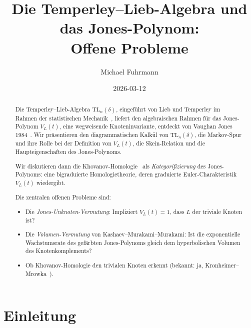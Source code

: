 \documentclass[12pt,a4paper]{amsart}
\theoremstyle{definition}
\theoremstyle{remark}
\begin{document}
\begin{abstract}
Die Temperley--Lieb-Algebra $\mathrm{TL}_n(\delta)$, eingeführt von Lieb und
Temperley im Rahmen der statistischen Mechanik~\cite{TemperleyLieb1971},
liefert den algebraischen Rahmen für das Jones-Polynom $V_L(t)$, eine
wegweisende Knoteninvariante, entdeckt von Vaughan Jones 1984~\cite{Jones1985}.
Wir präsentieren den diagrammatischen Kalkül von $\mathrm{TL}_n(\delta)$,
die Markov-Spur und ihre Rolle bei der Definition von $V_L(t)$, die Skein-Relation
und die Haupteigenschaften des Jones-Polynoms.

Wir diskutieren dann die Khovanov-Homologie~\cite{Khovanov2000} als
\emph{Kategorifizierung} des Jones-Polynoms: eine bigraduierte Homologietheorie,
deren graduierte Euler-Charakteristik $V_L(t)$ wiedergibt.

Die zentralen offenen Probleme sind:
\begin{itemize}
\item Die \emph{Jones-Unknoten-Vermutung}: Impliziert $V_L(t) = 1$, dass $L$
      der triviale Knoten ist?
\item Die \emph{Volumen-Vermutung} von Kashaev--Murakami--Murakami: Ist die
      exponentielle Wachstumsrate des gefärbten Jones-Polynoms gleich dem
      hyperbolischen Volumen des Knotenkomplements?
\item Ob Khovanov-Homologie den trivialen Knoten erkennt (bekannt:
      ja, Kronheimer--Mrowka~\cite{KronheimerMrowka2011}).
\end{itemize}
\end{abstract}

\title{Die Temperley--Lieb-Algebra und das Jones-Polynom:\\
Offene Probleme}
\author{Michael Fuhrmann}
\address{Specialist Mathematics Project, Build 165}
\date{2026-03-12}

\maketitle

\section{Einleitung}
\end{document}
